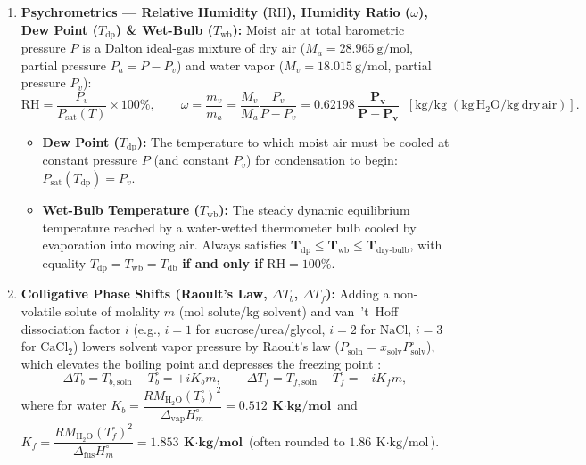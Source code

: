 \begin{enumerate}
  \item \textbf{Psychrometrics --- Relative Humidity ($\mathrm{RH}$), Humidity Ratio ($\omega$), Dew Point ($T_{\mathrm{dp}}$) \& Wet-Bulb ($T_{\mathrm{wb}}$):}
  Moist air at total barometric pressure $P$ is a Dalton ideal-gas mixture of dry air ($M_a = \SI{28.965}{\gram\per\mole}$, partial pressure $P_a = P - P_v$) and water vapor ($M_v = \SI{18.015}{\gram\per\mole}$, partial pressure $P_v$):
  \begin{equation}\label{eq:05:psychro}
    \mathrm{RH} = \frac{P_v}{P_{\mathrm{sat}}(T)} \times 100\%, \qquad
    \omega = \frac{m_v}{m_a} = \frac{M_v}{M_a}\frac{P_v}{P - P_v} = \mathbf{0.62198\,\frac{P_v}{P - P_v}} \;\;\left[\si{\kilogram\per\kilogram}\;(\mathrm{kg\,H_2O/kg\,dry\,air})\right].
  \end{equation}
  \begin{itemize}
    \item \textbf{Dew Point ($T_{\mathrm{dp}}$):} The temperature to which moist air must be cooled at constant pressure $P$ (and constant $P_v$) for condensation to begin: $P_{\mathrm{sat}}(T_{\mathrm{dp}}) = P_v$.
    \item \textbf{Wet-Bulb Temperature ($T_{\mathrm{wb}}$):} The steady dynamic equilibrium temperature reached by a water-wetted thermometer bulb cooled by evaporation into moving air. Always satisfies $\mathbf{T_{\mathrm{dp}} \leq T_{\mathrm{wb}} \leq T_{\mathrm{dry\text{-}bulb}}}$, with equality $T_{\mathrm{dp}} = T_{\mathrm{wb}} = T_{\mathrm{db}}$ \textbf{if and only if} $\mathrm{RH} = 100\%$.
  \end{itemize}
  \item \textbf{Colligative Phase Shifts (Raoult's Law, $\Delta T_b$, $\Delta T_f$):}
  Adding a non-volatile solute of molality $m$ ($\si{\mole\text{ solute}\per\kilogram\text{ solvent}}$) and van~'t~Hoff dissociation factor $i$ (e.g., $i=1$ for sucrose/urea/glycol, $i=2$ for $\mathrm{NaCl}$, $i=3$ for $\mathrm{CaCl_2}$) lowers solvent vapor pressure by Raoult's law ($P_{\mathrm{soln}} = x_{\mathrm{solv}}P_{\mathrm{solv}}^\circ$), which elevates the boiling point and depresses the freezing point :
  \begin{equation}\label{eq:05:colligative}
    \Delta T_b = T_{b,\mathrm{soln}} - T_b^\circ = +i K_b m, \qquad
    \Delta T_f = T_{f,\mathrm{soln}} - T_f^\circ = -i K_f m,
  \end{equation}
  where for water $K_b = \dfrac{R M_{\mathrm{H_2O}}(T_b^\circ)^2}{\Delta_{\mathrm{vap}}H_m^\circ} = \mathbf{\SI{0.512}{\kelvin\cdot\kilogram\per\mole}}$ and $K_f = \dfrac{R M_{\mathrm{H_2O}}(T_f^\circ)^2}{\Delta_{\mathrm{fus}}H_m^\circ} = \mathbf{\SI{1.853}{\kelvin\cdot\kilogram\per\mole}}$ (often rounded to $\SI{1.86}{\kelvin\cdot\kilogram\per\mole}$).
\end{enumerate}

